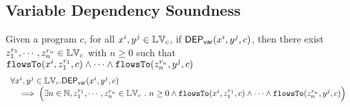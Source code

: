 %
\subsection{Variable Dependency Soundness}
%
\begin{thm}
\label{thm:flowstovardep_sound}
Given a program ${c}$, for all  $ x^i, y^j \in \mathbb{LV}_{{c}}$, if $\mathsf{DEP_{var}}(x^i, y^j, {c})$,
then
there exist $z_1^{r_1}, \cdots, z_n^{r_n} \in \mathbb{LV}_{{c}}$ with $n \geq 0$ such that   
$\mathtt{flowsTo}(x^i,  z_1^{r_1}, c) 
\land \cdots \land \mathtt{flowsTo}(z_n^{r_n}, y^j, c)$
%
\[
\begin{array}{l}
  \forall x^i, y^j \in \mathbb{LV}_{{c}}.
  \mathsf{DEP_{var}}(x^i, y^j, {c})
  \\ \quad \implies
  \Big( \exists n \in \mathbb{N}, z_1^{r_1}, \cdots, z_n^{r_n} \in \mathbb{LV}_{{c}} ~.~ n \geq 0 \land
  \mathtt{flowsTo}(x^i,  z_1^{r_1}, c) 
  \land \cdots \land \mathtt{flowsTo}(z_n^{r_n}, y^j, c) \Big)
\end{array}
\]
\end{thm}
